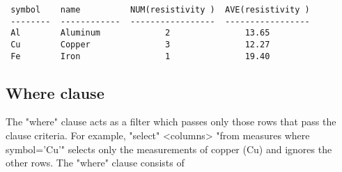 \begin{verbatim}
 symbol    name          NUM(resistivity )  AVE(resistivity )
 --------  ------------  -----------------  -----------------
 Al        Aluminum             2               13.65
 Cu        Copper               3               12.27
 Fe        Iron                 1               19.40
\end{verbatim}
\enddemo
 
\subsection{Where clause}
%
\label{where-clause}
The "where" clause acts as a filter which passes only
those rows that pass the clause criteria.
For example,
\<"select" <columns> "from measures where symbol='Cu'"\>
selects only the measurements of copper (Cu) and ignores
the other rows.
The "where" clause consists of
 
